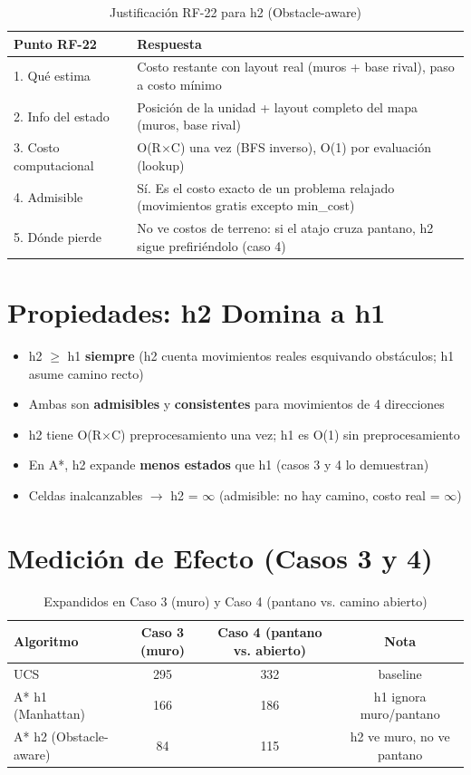 \begin{table}[H]
\centering
\caption{Justificación RF-22 para h2 (Obstacle-aware)}
\begin{tabular}{lp{8cm}}
\toprule
\textbf{Punto RF-22} & \textbf{Respuesta} \\
\midrule
1. Qué estima & Costo restante con layout real (muros + base rival), paso a costo mínimo \\
2. Info del estado & Posición de la unidad + layout completo del mapa (muros, base rival) \\
3. Costo computacional & O(R$\times$C) una vez (BFS inverso), O(1) por evaluación (lookup) \\
4. Admisible & Sí. Es el costo exacto de un problema relajado (movimientos gratis excepto min\_cost) \\
5. Dónde pierde & No ve costos de terreno: si el atajo cruza pantano, h2 sigue prefiriéndolo (caso 4) \\
\bottomrule
\end{tabular}
\end{table}
\label{tab:h2-rf22}


\section{Propiedades: h2 Domina a h1}
\label{sec:h2-domina}

\begin{itemize}
\item h2 $\ge$ h1 \textbf{siempre} (h2 cuenta movimientos reales esquivando obstáculos; h1 asume camino recto)
\item Ambas son \textbf{admisibles} y \textbf{consistentes} para movimientos de 4 direcciones
\item h2 tiene O(R$\times$C) preprocesamiento una vez; h1 es O(1) sin preprocesamiento
\item En A*, h2 expande \textbf{menos estados} que h1 (casos 3 y 4 lo demuestran)
\item Celdas inalcanzables $\to$ h2 = $\infty$ (admisible: no hay camino, costo real = $\infty$)
\end{itemize}

\section{Medición de Efecto (Casos 3 y 4)}
\label{sec:medicion-heuristicas}

\begin{table}[H]
\centering
\caption{Expandidos en Caso 3 (muro) y Caso 4 (pantano vs. camino abierto)}
\begin{tabular}{lccc}
\toprule
Algoritmo & Caso 3 (muro) & Caso 4 (pantano vs. abierto) & Nota \\
\midrule
UCS & 295 & 332 & baseline \\
A* h1 (Manhattan) & 166 & 186 & h1 ignora muro/pantano \\
A* h2 (Obstacle-aware) & 84 & 115 & h2 ve muro, no ve pantano \\
\bottomrule
\end{tabular}
\end{table}
\label{tab:heuristicas-expandidos}


